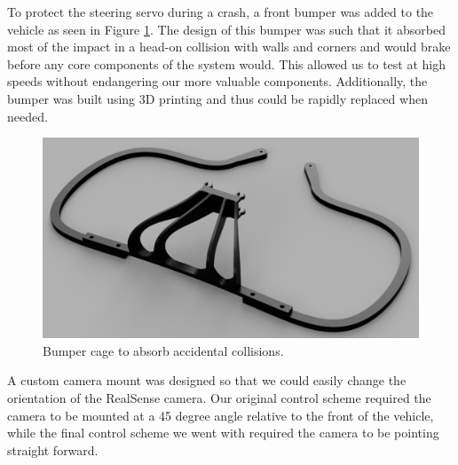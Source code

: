 \documentclass[letterpaper, 10 pt, conference]{ieeeconf}  %
\begin{document}
To protect the steering servo during a crash, a front bumper was added to the vehicle as seen in Figure \ref{bumper}. The design of this bumper was such that it absorbed most of the impact in a head-on collision with walls and corners and would brake before any core components of the system would. This allowed us to test at high speeds without  endangering our more valuable components. Additionally, the bumper was built using 3D printing and thus could be rapidly replaced when needed.

\begin{figure}[h]
\begin{center}
\includegraphics[width=.48\textwidth]{Figures/bumper.png}
\caption{Bumper cage to absorb accidental collisions.}
\label{bumper}
\end{center}
\end{figure}

A custom camera mount was designed so that we could easily change the orientation of the RealSense camera. Our original control scheme required the camera to be mounted at a 45 degree angle relative to the front of the vehicle, while the final control scheme we went with required the camera to be pointing straight forward.
\end{document}
